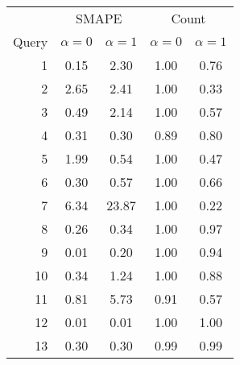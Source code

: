 \begin{tabular}{rcccc}
\toprule
      & \multicolumn{2}{c}{SMAPE}   & \multicolumn{2}{c}{Count} \\
Query & $\alpha = 0$ & $\alpha = 1$ & $\alpha = 0$ & $\alpha = 1$    \\
\midrule
    1 & 0.15         & 2.30         & 1.00         & 0.76            \\
    2 & 2.65         & 2.41         & 1.00         & 0.33            \\
    3 & 0.49         & 2.14         & 1.00         & 0.57            \\
    4 & 0.31         & 0.30         & 0.89         & 0.80            \\
    5 & 1.99         & 0.54         & 1.00         & 0.47            \\
    6 & 0.30         & 0.57         & 1.00         & 0.66            \\
    7 & 6.34         & 23.87        & 1.00         & 0.22            \\
    8 & 0.26         & 0.34         & 1.00         & 0.97            \\
    9 & 0.01         & 0.20         & 1.00         & 0.94            \\
   10 & 0.34         & 1.24         & 1.00         & 0.88            \\
   11 & 0.81         & 5.73         & 0.91         & 0.57            \\
   12 & 0.01         & 0.01         & 1.00         & 1.00            \\
   13 & 0.30         & 0.30         & 0.99         & 0.99            \\
\bottomrule
\end{tabular}
